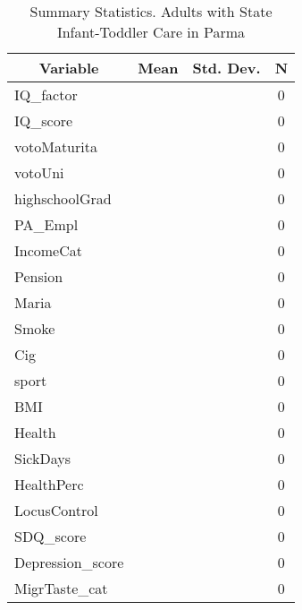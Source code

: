 
\begin{table}[htbp]\centering \caption{Summary Statistics. Adults with State Infant-Toddler Care in Parma \label{bothAdultasiloStatParma}}
\begin{tabular}{l c c  c}\hline\hline
\multicolumn{1}{c}{\textbf{Variable}} & \textbf{Mean}
 & \textbf{Std. Dev.} & \textbf{N}\\ \hline
IQ\_factor &  &   & 0\\
IQ\_score &  &   & 0\\
votoMaturita &  &   & 0\\
votoUni &  &   & 0\\
highschoolGrad &  &   & 0\\
PA\_Empl &  &   & 0\\
IncomeCat &  &   & 0\\
Pension &  &   & 0\\
Maria &  &   & 0\\
Smoke &  &   & 0\\
Cig &  &   & 0\\
sport &  &   & 0\\
BMI &  &   & 0\\
Health &  &   & 0\\
SickDays &  &   & 0\\
HealthPerc &  &   & 0\\
LocusControl &  &   & 0\\
SDQ\_score &  &   & 0\\
Depression\_score &  &   & 0\\
MigrTaste\_cat &  &   & 0\\
\hline\end{tabular}
\end{table}

